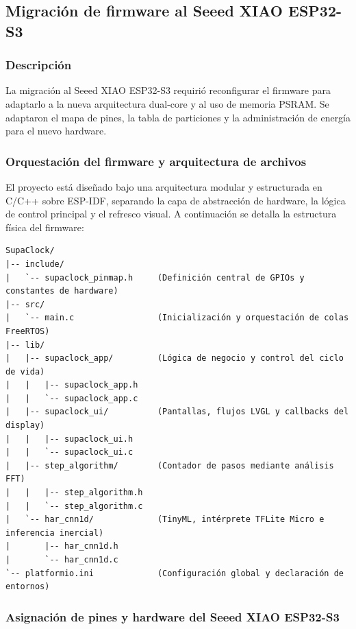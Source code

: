 \documentclass[letterpaper,11pt]{article}
\begin{document}
\subsection{Migración de firmware al Seeed XIAO ESP32-S3}

\subsubsection{Descripción}

La migración al Seeed XIAO ESP32-S3 requirió reconfigurar el firmware para adaptarlo a la nueva arquitectura dual-core y al uso de memoria PSRAM. Se adaptaron el mapa de pines, la tabla de particiones y la administración de energía para el nuevo hardware.

\subsubsection{Orquestación del firmware y arquitectura de archivos}

El proyecto está diseñado bajo una arquitectura modular y estructurada en C/C++ sobre ESP-IDF, separando la capa de abstracción de hardware, la lógica de control principal y el refresco visual. A continuación se detalla la estructura física del firmware:

\begin{verbatim}
SupaClock/
|-- include/
|   `-- supaclock_pinmap.h     (Definición central de GPIOs y constantes de hardware)
|-- src/
|   `-- main.c                 (Inicialización y orquestación de colas FreeRTOS)
|-- lib/
|   |-- supaclock_app/         (Lógica de negocio y control del ciclo de vida)
|   |   |-- supaclock_app.h
|   |   `-- supaclock_app.c
|   |-- supaclock_ui/          (Pantallas, flujos LVGL y callbacks del display)
|   |   |-- supaclock_ui.h
|   |   `-- supaclock_ui.c
|   |-- step_algorithm/        (Contador de pasos mediante análisis FFT)
|   |   |-- step_algorithm.h
|   |   `-- step_algorithm.c
|   `-- har_cnn1d/             (TinyML, intérprete TFLite Micro e inferencia inercial)
|       |-- har_cnn1d.h
|       `-- har_cnn1d.c
`-- platformio.ini             (Configuración global y declaración de entornos)
\end{verbatim}

\subsubsection{Asignación de pines y hardware del Seeed XIAO ESP32-S3}
\end{document}
